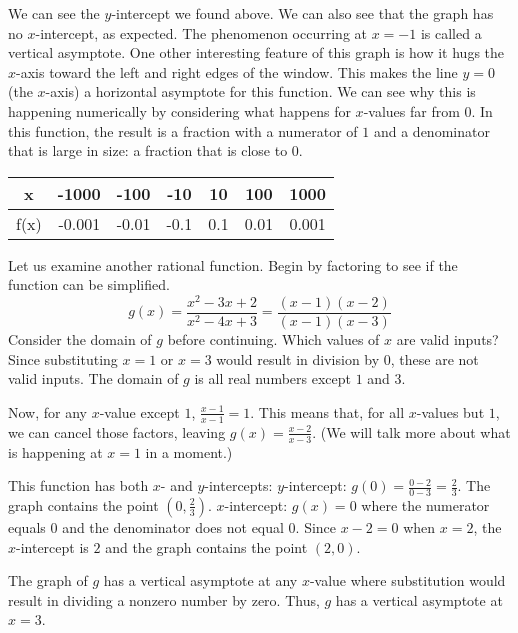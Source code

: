 We can see the \( y \)-intercept we found above. We can also see that the graph has no \( x \)-intercept, as expected. The phenomenon occurring at \( x = -1 \) is called a vertical asymptote. One other interesting feature of this graph is how it hugs the \( x \)-axis toward the left and right edges of the window. This makes the line \( y = 0 \) (the \( x \)-axis) a horizontal asymptote for this function. We can see why this is happening numerically by considering what happens for \( x \)-values far from \( 0 \). In this function, the result is a fraction with a numerator of \( 1 \) and a denominator that is large in size: a fraction that is close to \( 0 \).

\begin{center}
\begin{tabular}{ |c|c|c|c|c|c|c| } 
 \hline
 x & -1000 & -100 & -10 & 10 & 100 & 1000 \\ 
 \hline
 f(x) & -0.001 & -0.01 & -0.1 & 0.1 & 0.01 & 0.001 \\ 
 \hline
\end{tabular}
\end{center}

Let us examine another rational function. Begin by factoring to see if the function can be simplified.
\[ g(x) = \frac{x^2 - 3x + 2}{x^2 - 4x + 3} = \frac{(x - 1)(x - 2)}{(x - 1)(x - 3)} \]
Consider the domain of \( g \) before continuing. Which values of \( x \) are valid inputs? Since substituting \( x = 1 \) or \( x = 3 \) would result in division by \( 0 \), these are not valid inputs. The domain of \( g \) is all real numbers except \( 1 \) and \( 3 \).

Now, for any \( x \)-value except \( 1 \), \( \frac{x-1}{x-1} = 1 \). This means that, for all \( x \)-values but \(1\), we can cancel those factors, leaving \( g(x) = \frac{x-2}{x-3} \). (We will talk more about what is happening at \( x = 1 \) in a moment.)

This function has both \( x \)- and \( y \)-intercepts:
\( y \)-intercept: \( g(0) = \frac{0-2}{0-3} = \frac{2}{3} \). The graph contains the point \( (0, \frac{2}{3}) \).
\( x \)-intercept: \( g(x) = 0 \) where the numerator equals \( 0 \) and the denominator does not equal \( 0 \). Since \( x - 2 = 0 \) when \( x = 2 \), the \( x \)-intercept is \( 2 \) and the graph contains the point \( (2, 0) \).

The graph of \( g \) has a vertical asymptote at any \( x \)-value where substitution would result in dividing a nonzero number by zero. Thus, \( g \) has a vertical asymptote at \( x = 3 \).


